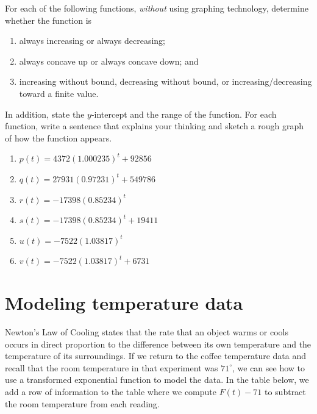 \documentclass[nooutcomes]{ximera}
\begin{document}
\begin{exploration}
For each of the following functions, \emph{without} using graphing technology, determine whether the function is
\begin{enumerate}[label=\roman*.]
\item always increasing or always decreasing;
\item always concave up or always concave down; and
\item increasing without bound, decreasing without bound, or increasing/decreasing toward a finite value.
\end{enumerate}
In addition, state the \(y\)-intercept and the range of the function.  For each function, write a sentence that explains your thinking and sketch a rough graph of how the function appears.
\begin{enumerate}[label=\alph*.]
\item \(p(t) = 4372 (1.000235)^t + 92856\)
\item \(q(t) = 27931 (0.97231)^t + 549786\)
\item \(r(t) = -17398 (0.85234)^t\)
\item \(s(t) = -17398 (0.85234)^t + 19411\)%
\item \(u(t) = -7522 (1.03817)^t\)%
\item \(v(t) = -7522 (1.03817)^t + 6731\)%
\end{enumerate}
\end{exploration}



\section{Modeling temperature data}
Newton's Law of Cooling  states that the rate that an object warms or cools occurs in direct proportion to the difference between its own temperature and the temperature of its surroundings.  If we return to the coffee temperature data  and recall that the room temperature in that experiment was \(71^\circ\), we can see how to use a transformed exponential function to model the data.  In the table below, we add a row of information to the table where we compute \(F(t)-71\) to subtract the room temperature from each reading.
\end{document}
